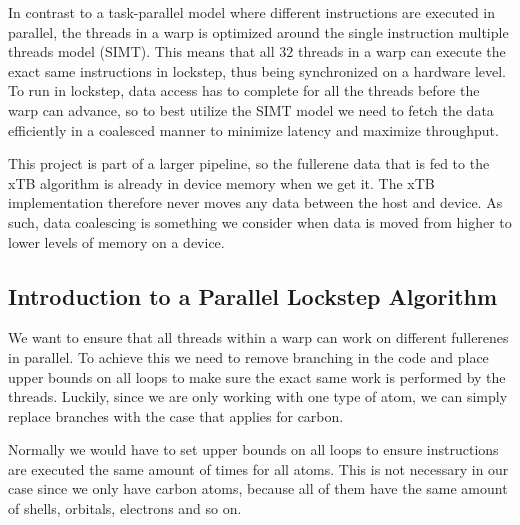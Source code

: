 
In contrast to a task-parallel model where different instructions are executed in parallel, the threads in a warp is optimized around the single instruction multiple threads model (SIMT). This means that all $32$ threads in a warp can execute the exact same instructions in lockstep, thus being synchronized on a hardware level. To run in lockstep, data access has to complete for all the threads before the warp can advance, so to best utilize the SIMT model we need to fetch the data efficiently in a coalesced manner to minimize latency and maximize throughput.

This project is part of a larger pipeline, so the fullerene data that is fed to the xTB algorithm is already in device memory when we get it. The xTB implementation therefore never moves any data between the host and device. As such, data coalescing is something we consider when data is moved from higher to lower levels of memory on a device.


\subsection{Introduction to a Parallel Lockstep Algorithm}

We want to ensure that all threads within a warp can work on different fullerenes in parallel. To achieve this we need to remove branching in the code and place upper bounds on all loops to make sure the exact same work is performed by the threads. Luckily, since we are only working with one type of atom, we can simply replace branches with the case that applies for carbon.

Normally we would have to set upper bounds on all loops to ensure instructions are executed the same amount of times for all atoms. This is not necessary in our case since we only have carbon atoms, because all of them have the same amount of shells, orbitals, electrons and so on.

